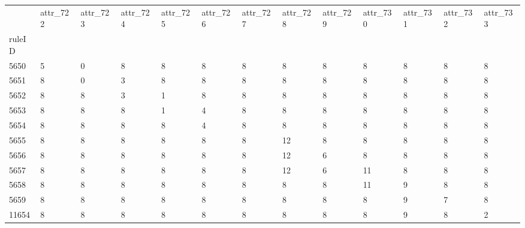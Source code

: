 \begin{tabular}{lllllllllllll}
\toprule
{} & attr\_722 & attr\_723 & attr\_724 & attr\_725 & attr\_726 & attr\_727 & attr\_728 & attr\_729 & attr\_730 & attr\_731 & attr\_732 & attr\_733 \\
ruleID &          &          &          &          &          &          &          &          &          &          &          &          \\
\midrule
5650   &        5 &        0 &        8 &        8 &        8 &        8 &        8 &        8 &        8 &        8 &        8 &        8 \\
5651   &        8 &        0 &        3 &        8 &        8 &        8 &        8 &        8 &        8 &        8 &        8 &        8 \\
5652   &        8 &        8 &        3 &        1 &        8 &        8 &        8 &        8 &        8 &        8 &        8 &        8 \\
5653   &        8 &        8 &        8 &        1 &        4 &        8 &        8 &        8 &        8 &        8 &        8 &        8 \\
5654   &        8 &        8 &        8 &        8 &        4 &        8 &        8 &        8 &        8 &        8 &        8 &        8 \\
5655   &        8 &        8 &        8 &        8 &        8 &        8 &       12 &        8 &        8 &        8 &        8 &        8 \\
5656   &        8 &        8 &        8 &        8 &        8 &        8 &       12 &        6 &        8 &        8 &        8 &        8 \\
5657   &        8 &        8 &        8 &        8 &        8 &        8 &       12 &        6 &       11 &        8 &        8 &        8 \\
5658   &        8 &        8 &        8 &        8 &        8 &        8 &        8 &        8 &       11 &        9 &        8 &        8 \\
5659   &        8 &        8 &        8 &        8 &        8 &        8 &        8 &        8 &        8 &        9 &        7 &        8 \\
11654  &        8 &        8 &        8 &        8 &        8 &        8 &        8 &        8 &        8 &        9 &        8 &        2 \\
\bottomrule
\end{tabular}
